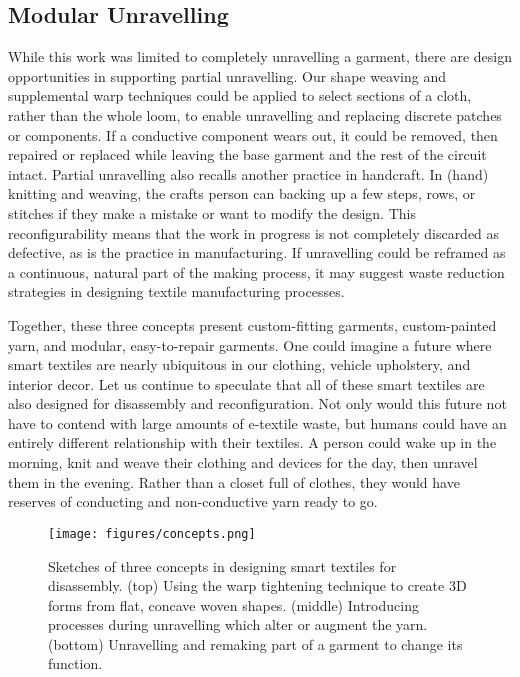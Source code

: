\documentclass{sigchi}
\newcommand\laura[1]{#1}
\newcommand\shanel[1]{#1}
\begin{document}

\subsection{Modular Unravelling}
\shanel{While this work was limited to completely unravelling a garment, there are design opportunities in supporting partial unravelling. Our shape weaving and supplemental warp techniques could be applied to select sections of a cloth, rather than the whole loom, to enable unravelling and replacing discrete patches or components. If a conductive component wears out, it could be removed, then repaired or replaced while leaving the base garment and the rest of the circuit intact. %
Partial unravelling also recalls another practice in handcraft. In (hand) knitting and weaving, the crafts person can backing up a few steps, rows, or stitches if they make a mistake or want to modify the design. This reconfigurability means that the work in progress is not completely discarded as defective, as is the practice in manufacturing. If unravelling could be reframed as a continuous, natural part of the making process, it may suggest waste reduction strategies in designing textile manufacturing processes.} 

Together, these three concepts present custom-fitting garments, custom-painted yarn, and modular, easy-to-repair garments. One could imagine a future where smart textiles are nearly ubiquitous in our clothing, vehicle upholstery, and interior decor. Let us continue to speculate that all of these smart textiles are also designed for disassembly and reconfiguration. Not only would this future not have to contend with large amounts of e-textile waste, but humans could have an entirely different relationship with their textiles. A person could wake up in the morning, knit and weave their clothing and devices for the day, then unravel them in the evening. Rather than a closet full of clothes, they would have reserves of conducting and non-conductive yarn ready to go.

\begin{figure}[t!]
    \centering
    \texttt{[image: figures/concepts.png]}
    \caption{Sketches of three concepts in designing smart textiles for disassembly. (top) Using the warp tightening technique to create 3D forms from flat, concave woven shapes. (middle) Introducing processes during unravelling which alter or augment the yarn. (bottom) Unravelling and remaking part of a garment to change its function.}
    \label{fig:concepts}
    \vspace{-1em}
\end{figure}
\end{document}
